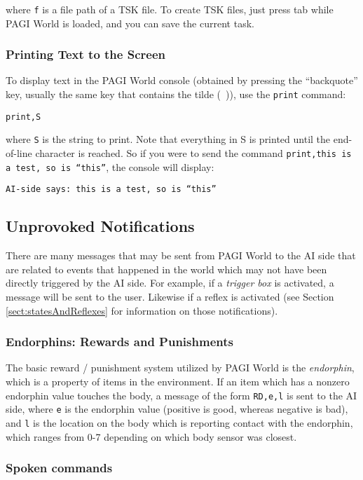 \noindent where \texttt{f} is a file path of a TSK file. To create TSK files, just press tab while PAGI World is loaded, and you can save the current task.

\subsubsection{Printing Text to the Screen}

To display text in the PAGI World console (obtained by pressing the ``backquote'' key, usually the same key that contains the tilde (~)), use the \texttt{print} command:

\texttt{print,S}

\noindent where \texttt{S} is the string to print. Note that everything in S is printed until the end-of-line character is reached. So if you were to send the command \texttt{print,this is a test, so is ``this''}, the console will display:

\texttt{AI-side says: this is a test, so is ``this''}

\subsection{Unprovoked Notifications}

There are many messages that may be sent from PAGI World to the AI side that are related to events that happened in the world which may not have been directly triggered by the AI side. For example, if a \textit{trigger box} is activated, a message will be sent to the user. Likewise if a reflex is activated (see Section \ref{sect:statesAndReflexes} for information on those notifications).

\subsubsection{Endorphins: Rewards and Punishments}

The basic reward / punishment system utilized by PAGI World is the \textit{endorphin}, which is a property of items in the environment. If an item which has a nonzero endorphin value touches the body, a message of the form \texttt{RD,e,l} is sent to the AI side, where \texttt{e} is the endorphin value (positive is good, whereas negative is bad), and \texttt{l} is the location on the body which is reporting contact with the endorphin, which ranges from 0-7 depending on which body sensor was closest.

\subsubsection{Spoken commands}


